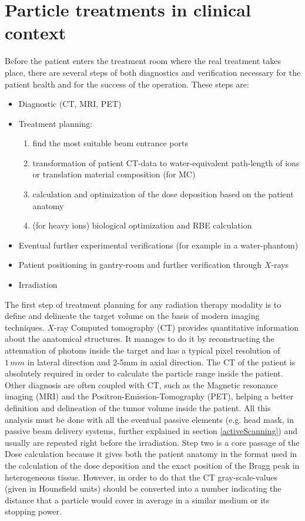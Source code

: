 \documentclass[12pt, a4paper, twoside]{book}
\begin{document}

\section{Particle treatments in clinical context}
Before the patient enters the treatment room where the real treatment takes place, there are several steps of both diagnostics and verification necessary for the patient health and for the success of the operation.
These steps are:
\begin{itemize}
\item Diagnostic (CT, MRI, PET)
\item Treatment planning:
	\begin{enumerate}
	\item find the most suitable beam entrance ports
	\item transformation of patient CT-data to water-equivalent path-length of ions or translation material composition (for MC)
	\item calculation and optimization of the dose deposition based on the patient anatomy
	\item (for heavy ions) biological optimization and RBE calculation
	\end{enumerate}
\item Eventual further experimental verifications (for example in a water-phantom)
\item Patient positioning in gantry-room and further verification through $X$-rays
\item Irradiation
\end{itemize}
The first step of treatment planning for any radiation therapy modality is to define and delineate the target volume on the basis of modern imaging techniques. $X$-ray Computed tomography (CT) provides quantitative information about the anatomical structures. It manages to do it by reconstructing the attenuation of photons inside the target and has a typical pixel resolution of $1\,mm$ in lateral direction and 2-5mm in axial direction. The CT of the patient is absolutely required in order to calculate the particle range inside the patient. Other diagnosis are often coupled with CT, such as the Magnetic resonance imaging (MRI) and the Positron-Emission-Tomography (PET), helping a better definition and delineation of the tumor volume inside the patient.
All this analysis must be done with all the eventual passive elements (e.g. head mask, in passive beam delivery systems, further explained in section \ref{activeScanning}) and usually are repeated right before the irradiation.
Step two is a core passage of the Dose calculation because it gives both the patient anatomy in the format used in the calculation of the dose deposition and the exact position of the Bragg peak in heterogeneous tissue.
However, in order to do that the CT gray-scale-values (given in Hounsfield units) should be converted into a number indicating the distance that a particle would cover in average in a similar medium or its stopping power.
\end{document}
